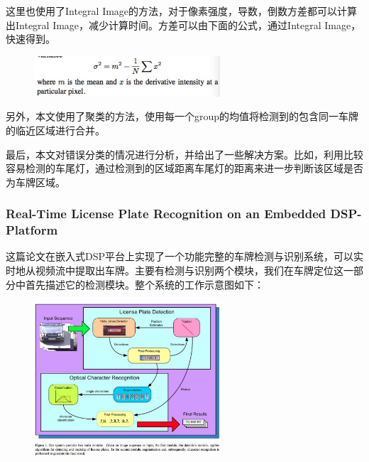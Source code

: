 这里也使用了Integral Image的方法，对于像素强度，导数，倒数方差都可以计算出Integral Image，减少计算时间。方差可以由下面的公式，通过Integral Image，快速得到。
\begin{figure}[H]
    \centering 
    \includegraphics[width=0.618\textwidth]{image/2_1_3_4.jpg}    
    \label{logic}
\end{figure}
另外，本文使用了聚类的方法，使用每一个group的均值将检测到的包含同一车牌的临近区域进行合并。

最后，本文对错误分类的情况进行分析，并给出了一些解决方案。比如，利用比较容易检测的车尾灯，通过检测到的区域距离车尾灯的距离来进一步判断该区域是否为车牌区域。

\subsubsection{Real-Time License Plate Recognition on an Embedded DSP-Platform}
这篇论文在嵌入式DSP平台上实现了一个功能完整的车牌检测与识别系统，可以实时地从视频流中提取出车牌。主要有检测与识别两个模块，我们在车牌定位这一部分中首先描述它的检测模块。整个系统的工作示意图如下：
\begin{figure}[H]
    \centering 
    \includegraphics[width=0.618\textwidth]{image/2_1_4_1.jpg}    
    \label{logic}
\end{figure}
